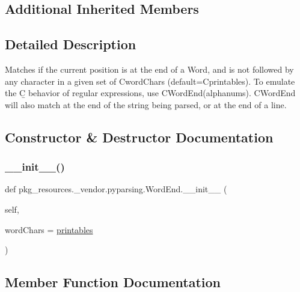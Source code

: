 \subsection*{Additional Inherited Members}


\subsection{Detailed Description}
\begin{DoxyVerb}Matches if the current position is at the end of a Word, and
is not followed by any character in a given set of C{wordChars}
(default=C{printables}). To emulate the C{\b} behavior of regular expressions,
use C{WordEnd(alphanums)}. C{WordEnd} will also match at the end of
the string being parsed, or at the end of a line.
\end{DoxyVerb}
 

\subsection{Constructor \& Destructor Documentation}
\mbox{\label{classpkg__resources_1_1__vendor_1_1pyparsing_1_1WordEnd_a61b04aa7ea3458523c747fb3e3b5789b}} 
\subsubsection{\texorpdfstring{\+\_\+\+\_\+init\+\_\+\+\_\+()}{\_\_init\_\_()}}
{\footnotesize\ttfamily def pkg\+\_\+resources.\+\_\+vendor.\+pyparsing.\+Word\+End.\+\_\+\+\_\+init\+\_\+\+\_\+ (\begin{DoxyParamCaption}\item[{}]{self,  }\item[{}]{word\+Chars = {\ttfamily \hyperlink{namespacepkg__resources_1_1__vendor_1_1pyparsing_af6012db114d431b92334582e9f73eae2}{printables}} }\end{DoxyParamCaption})}



\subsection{Member Function Documentation}
\mbox{\label{classpkg__resources_1_1__vendor_1_1pyparsing_1_1WordEnd_a8fa96ea9d8026ecc9dae92e526d629d8}} 
